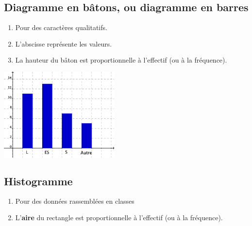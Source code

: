 \subsection{Diagramme en bâtons, ou diagramme en barres}

\begin{multicols}{2}
\begin{enumerate}
\item Pour des caractères qualitatifs.
\item L'abscisse représente les valeurs.
\item La hauteur du bâton est proportionnelle à l'effectif (ou à la fréquence).
\end{enumerate}

\columnbreak
  \begin{center}
    \includegraphics[width=6cm]{Stats_Fig4_DiagBaton.png}
  \end{center}    
\end{multicols}

\subsection{Histogramme}

\begin{enumerate}
\item Pour des données rassemblées en classes
\item L'\textbf{aire} du rectangle est proportionnelle à l'effectif (ou à la
fréquence). 
\end{enumerate}

